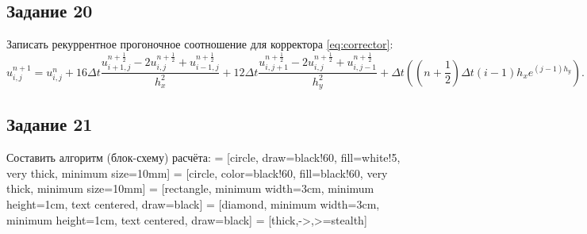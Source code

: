 \documentclass[12pt, a4paper]{report}
\begin{document}
	\subsection*{Задание 20}
	\large
	Записать рекуррентное прогоночное соотношение для корректора \eqref{eq:corrector}:
	\small
	\begin{equation*}
		u_{i, j}^{n+1} = u_{i, j}^{n} + 16\Delta t\frac{u_{i+1, j}^{n+\frac{1}{2}} - 2u_{i, j}^{n+\frac{1}{2}} + u_{i-1, j}^{n+\frac{1}{2}}}{h_{x}^{2}} + 12\Delta t\frac{u_{i, j+1}^{n+\frac{1}{2}} - 2u_{i, j}^{n+\frac{1}{2}} + u_{i, j-1}^{n+\frac{1}{2}}}{h_{y}^{2}} + \Delta t((n+\frac{1}{2})\Delta t(i-1)h_{x}e^{(j-1)h_{y}}).
	\end{equation*}
	\subsection*{Задание 21}
	\large
	Составить алгоритм (блок-схему) расчёта:
	\small
	 = [circle, draw=black!60, fill=white!5, very thick, minimum size=10mm]
	 = [circle, color=black!60, fill=black!60, very thick, minimum size=10mm]
	 = [rectangle, minimum width=3cm, minimum height=1cm, text centered, draw=black]
	 = [diamond, minimum width=3cm, minimum height=1cm, text centered, draw=black]
	 = [thick,->,>=stealth]
\end{document}
